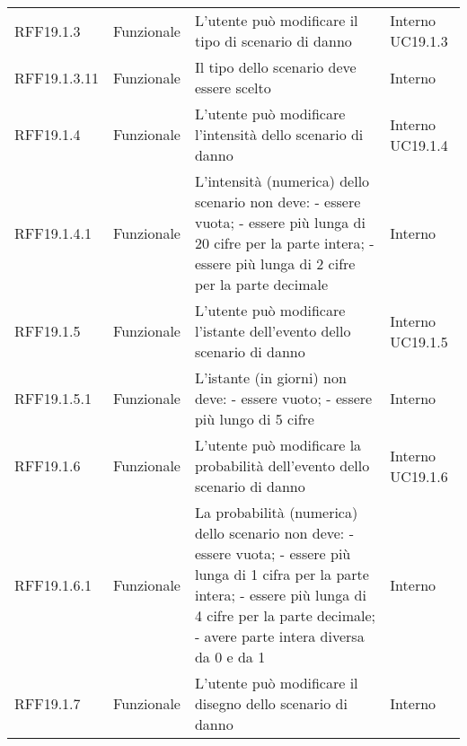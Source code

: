 \begin{longtable}{p{2cm}!{\VRule[1pt]}p{2cm}!{\VRule[1pt]}p{5cm}!{\VRule[1pt]}p{1.5cm}}
	RFF19.1.3                        & Funzionale\newline               & L'utente può modificare il tipo di scenario di danno                                                                     & Interno \newline UC19.1.3    
	\\
	RFF19.1.3.11                     & Funzionale\newline               & Il tipo dello scenario deve essere scelto                                                                                 & Interno                      \\
	RFF19.1.4                        & Funzionale\newline               & L'utente può modificare l'intensità  dello scenario di danno                                                            & Interno \newline UC19.1.4    
	\\
	RFF19.1.4.1&Funzionale\newline  & L'intensità (numerica) dello scenario non deve:
	- essere vuota;
	- essere più lunga di 20 cifre per la
	parte intera; 
	- essere più lunga di 2 cifre per la parte decimale & Interno \\
	RFF19.1.5                        & Funzionale\newline               & L'utente può modificare l'istante dell'evento dello scenario di danno                                                    & Interno \newline UC19.1.5    
	\\
	RFF19.1.5.1&Funzionale\newline  & L'istante (in giorni) non deve:
	- essere vuoto;
	- essere più lungo di 5 cifre & Interno \\
	RFF19.1.6                        & Funzionale\newline               & L'utente può modificare la probabilità  dell'evento dello scenario di danno                                             & Interno \newline UC19.1.6    
	\\
	RFF19.1.6.1&Funzionale\newline  & La probabilità (numerica) dello scenario non deve:
	- essere vuota;
	- essere più lunga di 1 cifra per la parte intera; 
	- essere più lunga di 4 cifre per la parte decimale;
	- avere parte intera diversa da 0 e da 1 & Interno \\
	RFF19.1.7                        & Funzionale\newline               & L'utente può modificare il disegno dello scenario di danno                                                               & Interno                      \\

\end{longtable}

